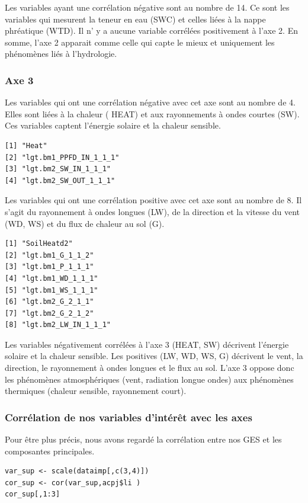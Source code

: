 \documentclass[a4paper,12pt]{report}%
\begin{document}
Les variables ayant une corrélation négative sont au nombre de 14. Ce sont les variables qui mesurent la teneur en eau (SWC) et celles liées à la nappe phréatique (WTD). \newline
Il n' y a aucune variable corrélées positivement à l'axe 2. \newline
En somme, l'axe 2 apparait comme celle qui capte le mieux et uniquement les phénomènes liés à l'hydrologie.

\subsubsection{Axe 3}

Les variables qui ont une corrélation négative avec cet axe sont au nombre de 4. Elles sont  liées à la chaleur ( HEAT) et aux rayonnements à ondes courtes (SW). Ces variables captent l'énergie solaire et la chaleur sensible.
\begin{lstlisting}
[1] "Heat"                 
[2] "lgt.bm1_PPFD_IN_1_1_1"
[3] "lgt.bm2_SW_IN_1_1_1"  
[4] "lgt.bm2_SW_OUT_1_1_1" 
\end{lstlisting}

Les variables qui ont une corrélation positive avec cet axe sont au nombre de 8. Il s'agit du rayonnement à ondes longues (LW), de la direction  et la vitesse du vent (WD, WS) et du flux de chaleur au sol (G).

\begin{lstlisting}
[1] "SoilHeatd2"         
[2] "lgt.bm1_G_1_1_2"    
[3] "lgt.bm1_P_1_1_1"    
[4] "lgt.bm1_WD_1_1_1"   
[5] "lgt.bm1_WS_1_1_1"   
[6] "lgt.bm2_G_2_1_1"    
[7] "lgt.bm2_G_2_1_2"    
[8] "lgt.bm2_LW_IN_1_1_1"
\end{lstlisting}

Les variables négativement corrélées à l’axe 3 (HEAT, SW) décrivent l’énergie solaire et la chaleur sensible. Les positives (LW, WD, WS, G) décrivent le vent, la direction, le rayonnement à ondes longues et le flux au sol. L’axe 3 oppose donc les phénomènes atmosphériques (vent, radiation longue ondes) aux phénomènes thermiques (chaleur sensible, rayonnement court). 

\subsubsection{Corrélation de nos variables d'intérêt avec les axes}
Pour être plus précis, nous avons regardé la corrélation entre nos GES et les composantes principales.

\begin{lstlisting}
var_sup <- scale(dataimp[,c(3,4)])  
cor_sup <- cor(var_sup,acpj$li )
cor_sup[,1:3]
\end{lstlisting}
\end{document}
